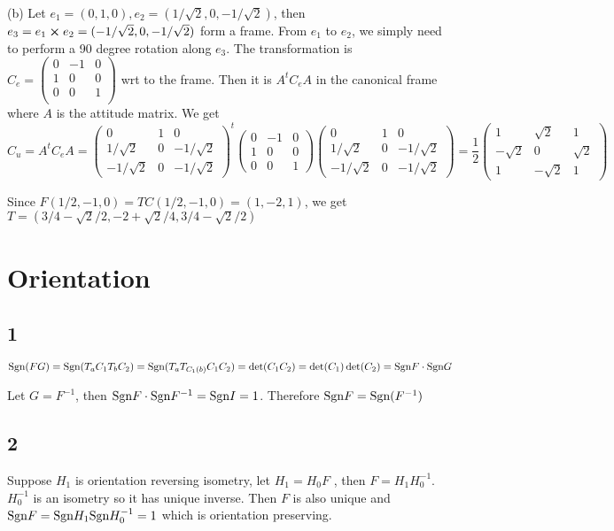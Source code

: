 \documentclass[12pt]{article}
\begin{document}
(b)
Let $e_1 = (0, 1, 0),  e_2 = (1/\sqrt{2}, 0, - 1/\sqrt{2})$, then $e_3 = e_1 \cross e_2 = (-1/\sqrt{2}, 0, -1/\sqrt{2})$ form a frame. From $e_1$ to $e_2$, we simply need to perform a 90 degree rotation along $e_3$. The transformation is  $C_e = \begin{pmatrix}
	0 & -1 & 0 \\ 
	1 & 0 & 0 \\
	0 & 0 & 1 \\
\end{pmatrix}$ wrt to the frame. Then it is $A^t C_e A$ in the canonical frame where $A$ is the attitude matrix. We get 
$$
  C_u = A^t C_e A = \begin{pmatrix}
  	0 & 1 & 0 \\
  	1/\sqrt{2} & 0 & -1/\sqrt{2} \\
  	-1/\sqrt{2} & 0 & -1/\sqrt{2} 
  \end{pmatrix}^t
\begin{pmatrix}
	0 & -1 & 0 \\
	1 &  0 & 0 \\
	0 &  0 & 1
\end{pmatrix}
\begin{pmatrix}
	0 & 1 & 0 \\
	1/\sqrt{2} & 0 & -1/\sqrt{2} \\
	-1/\sqrt{2} & 0 & -1/\sqrt{2} 
\end{pmatrix}
= \frac{1}{2} \begin{pmatrix}
	1 & \sqrt{2} & 1 \\- \sqrt{2} & 0  & \sqrt{2} \\ 1 & - \sqrt{2} & 1 
\end{pmatrix}
$$

Since $F(1/2, -1, 0) = TC(1/2, -1, 0) = (1, -2, 1)$, we get $T = (3/4 - \sqrt{2}/2, -2 + \sqrt{2}/4 , 3/4 - \sqrt{2}/ 2) $

\section{Orientation}
\subsection*{1}
$\mbox{Sgn}(FG) = \mbox{Sgn} (T_aC_1T_bC_2 ) =\mbox{Sgn}(T_aT_{C_1(b)}C_1C_2) = \det(C_1C_2)  = \det(C_1)\det(C_2) = \mbox{Sgn} F \cdot \mbox{Sgn} G  $

Let $G = F^{-1}$, then $\mbox{Sgn} F \cdot \mbox{Sgn} F^{-1} = \mbox{Sgn} I = 1$. Therefore $\mbox{Sgn} F = \mbox{Sgn}(F^{-1})$

\subsection*{2}
Suppose $H_1$ is orientation reversing isometry, let $H_1 = H_0F$ , then $F = H_1 H_0^{-1}$. $H_0^{-1}$ is an isometry so it has unique inverse. Then $F$ is also unique and $\mbox{Sgn} F = \mbox{Sgn} H_1 \mbox{Sgn} H_0^{-1} = 1$ which is orientation preserving.
\end{document}
